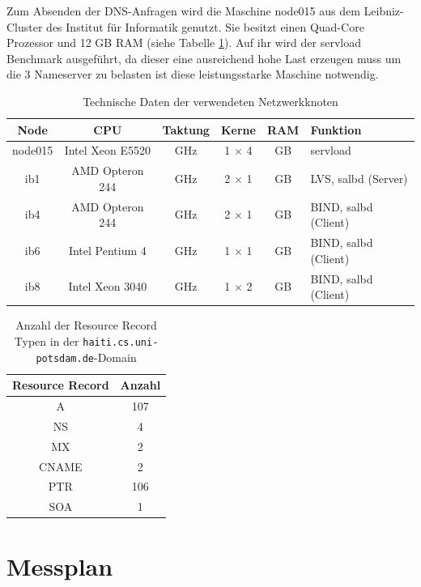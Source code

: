 \documentclass[a4paper, 12pt, BCOR10mm, DIV12, toc=bibliography, toc=listof, german]{scrbook}
\begin{document}
		Zum Absenden der DNS-Anfragen wird die Maschine node015 aus dem Leibniz-Cluster des Institut für
		Informatik genutzt. Sie besitzt einen Quad-Core Prozessor und 12 GB RAM (siehe Tabelle
		\ref{tab:netzwerkknoten}). Auf ihr wird der servload Benchmark ausgeführt, da dieser eine
		ausreichend hohe Last erzeugen muss um die 3 Nameserver zu belasten ist diese leistungsstarke
		Maschine notwendig.

		\begin{table}
			\centering
			\begin{tabular}{|c|c|c|c|c|l|}\hline
				Node & CPU &  Taktung & Kerne & RAM & Funktion \\\hline
				node015 & Intel Xeon E5520 & \unit[2,27]{GHz} & 1 $\times$ 4 & \unit[12]{GB} & servload\\
				ib1 & AMD Opteron 244 & \unit[1,8]{GHz} & 2 $\times$ 1 & \unit[4]{GB} & LVS, salbd (Server)\\
				ib4 & AMD Opteron 244 & \unit[1,8]{GHz} & 2 $\times$ 1 & \unit[4]{GB} & BIND, salbd (Client)\\
				ib6 & Intel Pentium 4 & \unit[2,8]{GHz} & 1 $\times$ 1 & \unit[4]{GB} & BIND, salbd (Client)\\
				ib8 & Intel Xeon 3040 & \unit[1,86]{GHz} & 1 $\times$ 2 & \unit[4]{GB} & BIND, salbd (Client)\\\hline
			\end{tabular}
			\caption{Technische Daten der verwendeten Netzwerkknoten}
			\label{tab:netzwerkknoten}
		\end{table}

		\begin{table}
			\centering
			\begin{tabular}{|c|c|}\hline
				Resource Record & Anzahl \\\hline
				A & 107 \\
				NS & 4 \\
				MX & 2 \\
				CNAME & 2 \\
				PTR & 106 \\
				SOA & 1 \\\hline
			\end{tabular}
			\caption{Anzahl der Resource Record Typen in der \texttt{haiti.cs.uni-potsdam.de}-Domain}
			\label{tab:rr-domain}
		\end{table}
			

		\section{Messplan} %
		\label{sec:messplan}
\end{document}
